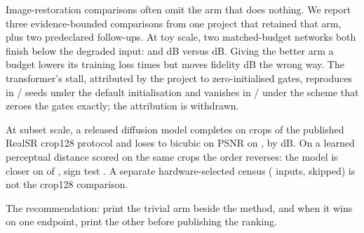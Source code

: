 Image-restoration comparisons often omit the arm that does nothing. We report
three evidence-bounded comparisons from one project that retained that arm,
plus two predeclared follow-ups. At toy scale, two matched-budget networks both
finish below the degraded input: \ToyConv{} and \ToyTrans{} dB versus
\ToyDegraded{} dB. Giving the better arm a \BudgetFold{} budget lowers its
training loss \ToyLossDrop{} times but moves fidelity \ToyLongRegression{} dB
the wrong way. The transformer's stall, attributed by the project to
zero-initialised gates, reproduces in \InitDefaultStall{}/\InitSeeds{} seeds
under the default initialisation and vanishes in \InitZeroEscape{}/\InitSeeds{}
under the scheme that zeroes the gates exactly; the attribution is withdrawn.

At subset scale, a released diffusion model completes on \SubsetN{} crops of
the published RealSR crop128 protocol and loses to bicubic on PSNR on
\LossesBicubic{}, by \GapBicubicAbs{} dB. On a learned perceptual distance
scored on the same crops the order reverses: the model is closer on
\LpipsWins{} of \SubsetN{}, sign test \LpipsSignP{}. A separate
hardware-selected census (\CensusTotal{} inputs, \CensusSkipped{} skipped) is
not the crop128 comparison.

The recommendation: print the trivial arm beside the method, and when it wins
on one endpoint, print the other before publishing the ranking.

